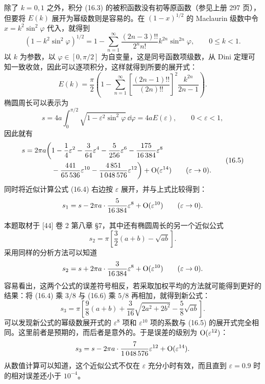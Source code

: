 \begin{xsolution}
除了 $k=0,1$ 之外，积分 (16.3) 的被积函数没有初等原函数（参见上册 297 页），但要将 $E(k)$ 展开为幂级数则是容易的。在 $(1-x)^{1/2}$ 的 Maclaurin 级数中令 $x=k^2\sin^2\varphi$ 代入，就得到
\[
  (1-k^2\sin^2\varphi)^{1/2}
  =1-\sum_{n=1}^{\infty}\frac{(2n-3)!!}{2^n n!}k^{2n}\sin^{2n}\varphi,
  \qquad 0\leqslant k<1.
\]
以 $k$ 为参数，以 $\varphi\in[0,\pi/2]$ 为自变量，这是同号函数项级数，从 Dini 定理可知一致收敛，因此可以逐项积分，这样就得到所要的展开式：
\[
  E(k)=\frac{\pi}{2}\left(1-\sum_{n=1}^{\infty}
  \left[\frac{(2n-1)!!}{(2n)!!}\right]^2\frac{k^{2n}}{2n-1}\right).
\]
椭圆周长可以表示为
\[
  s=4a\int_0^{\pi/2}\sqrt{1-\varepsilon^2\sin^2\varphi}\,\dd\varphi
  =4aE(\varepsilon),\qquad 0<\varepsilon<1,
\]
因此就有
\begin{equation}
\begin{aligned}
  s=2\pi a\biggl(&1-\frac14\varepsilon^2-\frac{3}{64}\varepsilon^4
  -\frac{5}{256}\varepsilon^6-\frac{175}{16\,384}\varepsilon^8\\
  &-\frac{441}{65\,536}\varepsilon^{10}-\frac{4\,851}{1\,048\,576}\varepsilon^{12}\biggr)
  +\mathrm{O}(\varepsilon^{14})\qquad(\varepsilon\to0).
\end{aligned}
\tag{16.5}
\label{eq:16.5}
\end{equation}
同时将近似计算公式 (16.4) 右边按 $\varepsilon$ 展开，并与上式比较得到：
\[
  s_1=s-2\pi a\cdot\frac{5}{16\,384}\varepsilon^8+\mathrm{O}(\varepsilon^{10})
  \qquad(\varepsilon\to0).
\]
\end{xsolution}

\begin{xremark}
本题取材于 [44] 卷 2 第八章 §7，其中还有椭圆周长的另一个近似公式
\begin{equation}
  s_2=\pi\left[\frac32(a+b)-\sqrt{ab}\right].
\tag{16.6}
\label{eq:16.6}
\end{equation}
采用同样的分析方法可以知道
\[
  s_2=s+2\pi a\cdot\frac{3}{16\,384}\varepsilon^8+\mathrm{O}(\varepsilon^{10})
  \qquad(\varepsilon\to0).
\]
容易看出，这两个公式的误差符号相反，若采取加权平均的方法就可能得到更好的结果：将 (16.4) 乘 $3/8$ 与 (16.6) 乘 $5/8$ 再相加，就得到新公式：
\begin{equation}
  s_3=\pi\left[\frac98(a+b)+\frac{3}{16}\sqrt{2a^2+2b^2}-\frac58\sqrt{ab}\right].
\tag{16.7}
\label{eq:16.7}
\end{equation}
可以发现新公式的幂级数展开式的 $\varepsilon^8$ 项和 $\varepsilon^{10}$ 项的系数与 (16.5) 的展开式完全相同。这里前者是预期的，而后者是意外的。于是误差的级别为 $\mathrm{O}(\varepsilon^{12})$：
\[
  s_3=s-2\pi a\cdot\frac{7}{1\,048\,576}\varepsilon^{12}+\mathrm{O}(\varepsilon^{14}).
\]
从数值计算可以知道，这个近似公式不仅在 $\varepsilon$ 充分小时有效，而且直到 $\varepsilon=0.9$ 时的相对误差还小于 $10^{-4}$。
\end{xremark}

